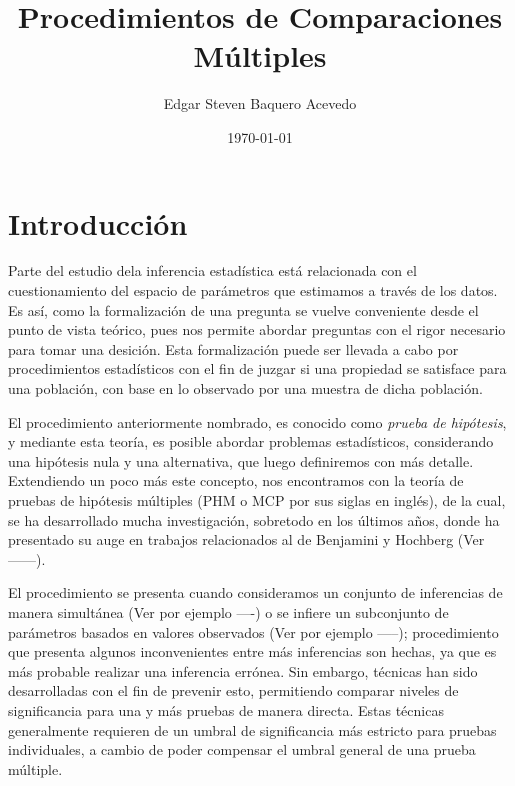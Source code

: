 \documentclass{article}
\title{Procedimientos de Comparaciones Múltiples}
\author{Edgar Steven Baquero Acevedo}
\date{\today}
\theoremstyle{definition}
\begin{document}
\maketitle
\section{Introducción}
Parte del estudio dela inferencia estadística está relacionada con el cuestionamiento del espacio de parámetros que estimamos a través de los datos. Es así, como la formalización de una pregunta se vuelve conveniente desde el punto de vista teórico, pues nos permite abordar preguntas con el rigor necesario para tomar una desición. Esta formalización puede ser llevada a cabo por procedimientos estadísticos con el fin de juzgar si una propiedad se satisface para una población, con base en lo observado por una muestra de dicha población.

El procedimiento anteriormente nombrado, es conocido como \linebreak \textit{prueba de hipótesis}, y mediante esta teoría, es posible abordar problemas estadísticos, considerando una hipótesis nula y una alternativa, que luego definiremos con más detalle. Extendiendo un poco más este concepto, nos encontramos con la teoría de pruebas de hipótesis múltiples (PHM o MCP por sus siglas en inglés), de la cual, se ha desarrollado mucha investigación, sobretodo en los últimos años, donde ha presentado su auge en trabajos relacionados al de Benjamini y Hochberg (Ver ------).%

El procedimiento se presenta cuando consideramos un conjunto de inferencias de manera simultánea (Ver por ejemplo ----)%
 o se infiere un subconjunto de parámetros basados en valores observados (Ver por ejemplo -----);%
 procedimiento que presenta algunos inconvenientes entre más inferencias son hechas, ya que es más probable realizar una inferencia errónea. Sin embargo, técnicas han sido desarrolladas con el fin de prevenir esto, permitiendo comparar niveles de significancia para una y más pruebas de manera directa. Estas técnicas generalmente requieren de un umbral de significancia más estricto para pruebas individuales, a cambio de poder compensar el umbral general de una prueba múltiple.
 	
\end{document}
